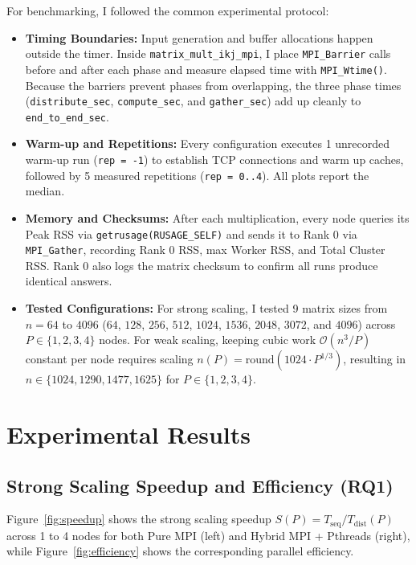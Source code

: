 \documentclass[11pt,a4paper]{article}
\begin{document}
For benchmarking, I followed the common experimental protocol:
\begin{itemize}
    \item \textbf{Timing Boundaries:} Input generation and buffer allocations happen outside the timer. Inside \texttt{matrix\_mult\_ikj\_mpi}, I place \texttt{MPI\_Barrier} calls before and after each phase and measure elapsed time with \texttt{MPI\_Wtime()}. Because the barriers prevent phases from overlapping, the three phase times (\texttt{distribute\_sec}, \texttt{compute\_sec}, and \texttt{gather\_sec}) add up cleanly to \texttt{end\_to\_end\_sec}.
    \item \textbf{Warm-up and Repetitions:} Every configuration executes 1 unrecorded warm-up run (\texttt{rep = -1}) to establish TCP connections and warm up caches, followed by 5 measured repetitions (\texttt{rep = 0..4}). All plots report the median.
    \item \textbf{Memory and Checksums:} After each multiplication, every node queries its Peak RSS via \texttt{getrusage(RUSAGE\_SELF)} and sends it to Rank 0 via \texttt{MPI\_Gather}, recording Rank 0 RSS, max Worker RSS, and Total Cluster RSS. Rank 0 also logs the matrix checksum to confirm all runs produce identical answers.
    \item \textbf{Tested Configurations:} For strong scaling, I tested 9 matrix sizes from $n = 64$ to $4096$ ($64$, $128$, $256$, $512$, $1024$, $1536$, $2048$, $3072$, and $4096$) across $P \in \{1, 2, 3, 4\}$ nodes. For weak scaling, keeping cubic work $\mathcal{O}(n^3 / P)$ constant per node requires scaling $n(P) = \text{round}(1024 \cdot P^{1/3})$, resulting in $n \in \{1024, 1290, 1477, 1625\}$ for $P \in \{1, 2, 3, 4\}$.
\end{itemize}

\section{Experimental Results}

\subsection{Strong Scaling Speedup and Efficiency (RQ1)}
Figure~\ref{fig:speedup} shows the strong scaling speedup $S(P) = T_{\text{seq}} / T_{\text{dist}}(P)$ across 1 to 4 nodes for both Pure MPI (left) and Hybrid MPI + Pthreads (right), while Figure~\ref{fig:efficiency} shows the corresponding parallel efficiency.
\end{document}
